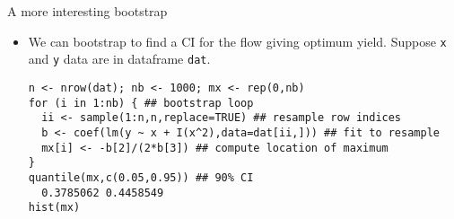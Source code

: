 \documentclass{beamer}
\newcommand{\eps}[3]
{{\begin{center}
 \rotatebox{#1}{\scalebox{#2}{\texttt{[image: \#3]}}}
 \end{center}}
}
\begin{document}
\begin{frame}[fragile]{A more interesting bootstrap}
\begin{itemize}
\item We can bootstrap to find a CI for the flow giving optimum yield. Suppose {\tt x} and {\tt y} data are in dataframe {\tt dat}. 
{\scriptsize
\begin{verbatim}
n <- nrow(dat); nb <- 1000; mx <- rep(0,nb)
for (i in 1:nb) { ## bootstrap loop
  ii <- sample(1:n,n,replace=TRUE) ## resample row indices
  b <- coef(lm(y ~ x + I(x^2),data=dat[ii,])) ## fit to resample
  mx[i] <- -b[2]/(2*b[3]) ## compute location of maximum
}
quantile(mx,c(0.05,0.95)) ## 90% CI
  0.3785062 0.4458549
hist(mx)
\end{verbatim}
} 
\vspace*{-.5cm}
\eps{-90}{.35}{quad-mod-hist.eps}

\end{itemize}
\end{frame}
\end{document}
